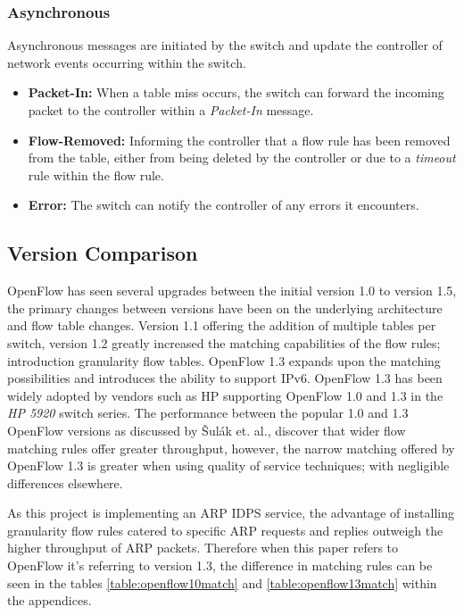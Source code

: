 \documentclass[12pt, oneside]{book}
\begin{document}
\subsubsection{Asynchronous}
Asynchronous messages are initiated by the switch and update the controller of network events occurring within the switch.
\begin{itemize}
	\itemsep0em 
	\item \textbf{Packet-In:} When a table miss occurs, the switch can forward the incoming packet to the
				controller within a \emph{Packet-In} message.
	\item \textbf{Flow-Removed:} Informing the controller that a flow rule has been removed from the table, either
				from being deleted by the controller or due to a \emph{timeout} rule within the flow rule.
	\item \textbf{Error:} The switch can notify the controller of any errors it encounters.
\end{itemize}



\subsection{Version Comparison}
OpenFlow has seen several upgrades between the initial version 1.0 to version 1.5, the primary changes between versions
have been on the underlying architecture and flow table changes. Version 1.1 offering the addition of multiple tables per switch,
version 1.2 greatly increased the matching capabilities of the flow rules; introduction granularity flow tables.
OpenFlow 1.3 expands upon the matching possibilities and introduces the ability to support IPv6.
OpenFlow 1.3 has been widely adopted
by vendors such as HP supporting OpenFlow 1.0 and 1.3 in the \emph{HP 5920} switch series\cite{packard}.
The performance between the popular 1.0 and 1.3 OpenFlow versions as discussed by {\v{S}}ul{\'a}k et. al.\cite{vsulak2016performance},
discover that wider flow matching rules offer greater throughput, however, the narrow matching offered by OpenFlow 1.3 is greater
when using quality of service techniques; with negligible differences elsewhere.

As this project is implementing an ARP IDPS service, the advantage of installing granularity flow rules catered to specific
ARP requests and replies outweigh the higher throughput of ARP packets. Therefore when this paper refers to OpenFlow it's
referring to version 1.3, the difference in matching rules can be seen in the tables \ref{table:openflow10match} and \ref{table:openflow13match}
within the appendices.
\end{document}
